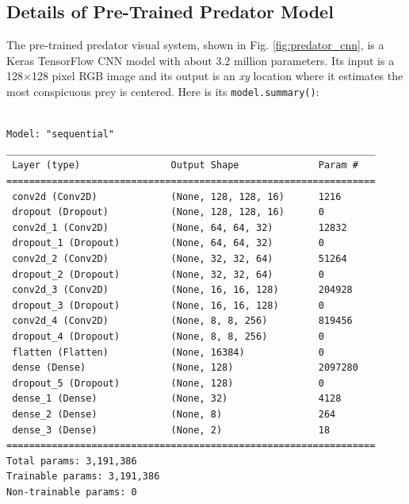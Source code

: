 \documentclass[letterpaper]{article}
\begin{document}
\subsection{Details of Pre-Trained Predator Model}
The pre-trained predator visual system, shown in Fig. \ref{fig:predator_cnn}, is a Keras TensorFlow CNN model with about 3.2 million parameters. Its input is a 128×128 pixel RGB image and its output is an \textit{xy} location where it estimates the most conspicuous prey is centered. Here is its \texttt{model.summary()}:
\par
\begin{minipage}{\linewidth-1.1cm}
\hspace*{1cm}
\begin{minipage}{\linewidth-1.1cm}
\begin{small}
\begin{verbatim}

Model: "sequential"
_________________________________________________________________
 Layer (type)                Output Shape              Param #
=================================================================
 conv2d (Conv2D)             (None, 128, 128, 16)      1216
 dropout (Dropout)           (None, 128, 128, 16)      0
 conv2d_1 (Conv2D)           (None, 64, 64, 32)        12832
 dropout_1 (Dropout)         (None, 64, 64, 32)        0
 conv2d_2 (Conv2D)           (None, 32, 32, 64)        51264
 dropout_2 (Dropout)         (None, 32, 32, 64)        0
 conv2d_3 (Conv2D)           (None, 16, 16, 128)       204928
 dropout_3 (Dropout)         (None, 16, 16, 128)       0
 conv2d_4 (Conv2D)           (None, 8, 8, 256)         819456
 dropout_4 (Dropout)         (None, 8, 8, 256)         0
 flatten (Flatten)           (None, 16384)             0
 dense (Dense)               (None, 128)               2097280
 dropout_5 (Dropout)         (None, 128)               0
 dense_1 (Dense)             (None, 32)                4128
 dense_2 (Dense)             (None, 8)                 264
 dense_3 (Dense)             (None, 2)                 18
=================================================================
Total params: 3,191,386
Trainable params: 3,191,386
Non-trainable params: 0
\end{verbatim}
\end{small}
\end{minipage}
\end{minipage}
\par
\end{document}
